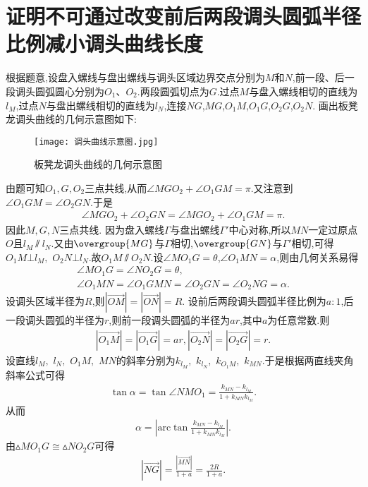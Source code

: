 \documentclass[lang=cn,newtx,10pt,scheme=chinese]{../Template/elegantbook}
\begin{document}
\section{证明不可通过改变前后两段调头圆弧半径比例减小调头曲线长度}
根据题意,设盘入螺线与盘出螺线与调头区域边界交点分别为$M$和$N$,前一段、后一段调头圆弧圆心分别为$O_1、O_2$.两段圆弧切点为$G$.过点$M$与盘入螺线相切的直线为$l_M$,过点$N$与盘出螺线相切的直线为$l_N$,连接$NG$,$MG$,$O_1M$,$O_1G$,$O_2G$,$O_2N$.
画出板凳龙调头曲线的几何示意图如下:
\begin{figure}[htbp]
\centering
\texttt{[image: 调头曲线示意图.jpg]}
\caption{板凳龙调头曲线的几何示意图}
\label{figure1}
\end{figure}
由题可知$O_1,G,O_2$三点共线,从而$\angle MGO_2+\angle O_1GM=\pi .$又注意到$\angle O_1GM=\angle O_2GN$.于是
\begin{align}
\angle MGO_2+\angle O_2GN=\angle MGO_2+\angle O_1GM=\pi .
\end{align}
因此$M,G,N$三点共线.
因为盘入螺线$\varGamma$与盘出螺线$\varGamma'$中心对称,所以$MN$一定过原点$O$且$l_M \varparallel  l_N$.又由$\overgroup{MG}$与$\varGamma$相切,$\overgroup{GN}$与$\varGamma'$相切,可得$O_1M\bot l_M,$ $O_2N\bot l_N$.故$O_1M \varparallel O_2N$.设$\angle MO_1G=\theta$,$\angle O_1MN=\alpha$,则由几何关系易得
\begin{gather}
\angle MO_1G=\angle NO_2G=\theta,
\\
\angle O_1MN=\angle O_1GMN=\angle O_2GN=\angle O_2NG=\alpha .
\end{gather}
设调头区域半径为$R$,则$\left| \overrightarrow{OM} \right|=\left| \overrightarrow{ON} \right|=R$. 设前后两段调头圆弧半径比例为$a:1$,后一段调头圆弧的半径为$r$,则前一段调头圆弧的半径为$ar$,其中$a$为任意常数.则
\begin{align}
\left| \overrightarrow{O_1M} \right|=\left| \overrightarrow{O_1G} \right|=ar,\left| \overrightarrow{O_2N} \right|=\left| \overrightarrow{O_2G} \right|=r.    
\end{align}
设直线$l_M,$ $l_N,$ $O_1M,$ $MN$的斜率分别为$k_{l_M},$ $k_{l_N},$ $k_{O_1M},$ $k_{MN}$.于是根据两直线夹角斜率公式可得
\begin{align}
\tan \alpha =\tan \angle NMO_1=\frac{k_{MN}-k_{l_M}}{1+k_{MN}k_{l_M}}.
\end{align}
从而
\begin{align}
\alpha =\left| \mathrm{arc}\tan \frac{k_{MN}-k_{l_M}}{1+k_{MN}k_{l_M}} \right|.
\end{align}
由$\vartriangle MO_1G\cong \vartriangle NO_2G$可得
\begin{align}
\left| \overrightarrow{NG} \right|=\frac{\left| \overrightarrow{MN} \right|}{1+a}=\frac{2R}{1+a}.
\end{align}
\end{document}
